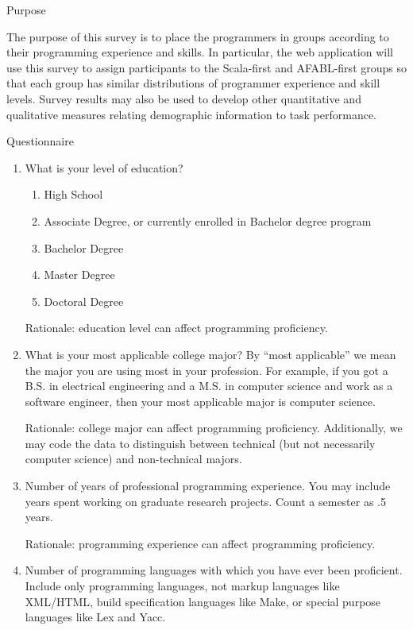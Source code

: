 \begin{appendices}
Purpose

The purpose of this survey is to place the programmers in groups according to their programming experience and skills.  In particular, the web application will use this survey to assign participants to the Scala-first and AFABL-first groups so that each group has similar distributions of programmer experience and skill levels.  Survey results may also be used to develop other quantitative and qualitative measures relating demographic information to task performance.

Questionnaire

\begin{enumerate}

\item What is your level of education?

\begin{enumerate}
\item High School
\item Associate Degree, or currently enrolled in Bachelor degree program
\item Bachelor Degree
\item Master Degree
\item Doctoral Degree
\end{enumerate}

Rationale: education level can affect programming proficiency.

\item What is your most applicable college major? By “most applicable” we mean the major you are using most in your profession. For example, if you got a B.S. in electrical engineering and a M.S. in computer science and work as a software engineer, then your most applicable major is computer science.

Rationale: college major can affect programming proficiency.  Additionally, we may code the data to distinguish between technical (but not necessarily computer science) and non-technical majors.

\item Number of years of professional programming experience. You may include years spent working on graduate research projects. Count a semester as .5 years.

Rationale: programming experience can affect programming proficiency.

\item Number of programming languages with which you have ever been proficient. Include only programming languages, not markup languages like XML/HTML, build specification languages like Make, or special purpose languages like Lex and Yacc.


\end{enumerate}
\end{appendices}
